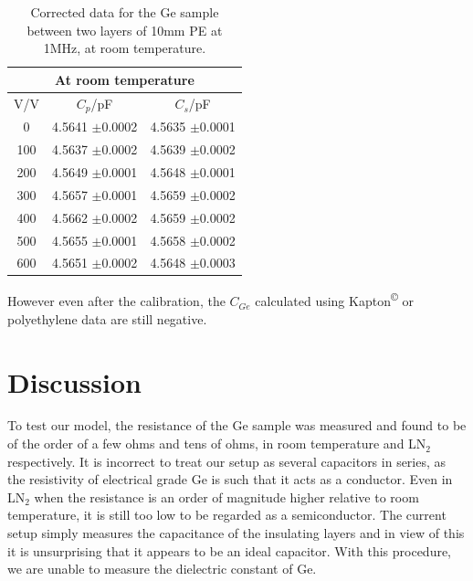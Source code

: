 \documentclass[a4paper,11pt]{article}
\begin{document}
\begin{table}[htbp]
\label{t:polyGeRTc}
\begin{center}
	\caption{Corrected data for the Ge sample between two layers of 10mm PE at 1MHz, at room temperature.}
\begin{tabular}{| c | c | c |}
	\hline
	\multicolumn{3}{|c|}{At room temperature}\\
	\hline
		V/V & $C_{p}$/pF & $C_{s}$/pF\\ \hline
		
		0 & 4.5641 $\pm$0.0002 & 4.5635 $\pm$0.0001\\ \hline
		100 & 4.5637 $\pm$0.0002 & 4.5639 $\pm$0.0002\\ \hline
		200 & 4.5649 $\pm$0.0001 & 4.5648 $\pm$0.0001\\ \hline
		300 & 4.5657 $\pm$0.0001 & 4.5659 $\pm$0.0002\\ \hline
		400 & 4.5662 $\pm$0.0002 & 4.5659 $\pm$0.0002\\ \hline
		500 & 4.5655 $\pm$0.0001 & 4.5658 $\pm$0.0002\\ \hline
		600 & 4.5651 $\pm$0.0002 & 4.5648 $\pm$0.0003\\
	\hline
\end{tabular}
\end{center}	
\end{table}

However even after the calibration, the $C_{Ge}$ calculated using Kapton\textsuperscript{\copyright} or polyethylene data are still negative.


\section{Discussion}
\label{s:discuss}

To test our model, the resistance of the Ge sample was measured and found to be of the order of a few ohms and tens of ohms, in room temperature and LN$_{2}$ respectively. %
It is incorrect to treat our setup as several capacitors in series, as the resistivity of electrical grade Ge is such that it acts as a conductor. Even in LN$_{2}$ when the resistance is an order of magnitude higher relative to room temperature, it is still too low to be regarded as a semiconductor. The current setup simply measures the capacitance of the insulating layers and in view of this it is unsurprising that it appears to be an ideal capacitor. With this procedure, we are unable to measure the dielectric constant of Ge.
\end{document}
